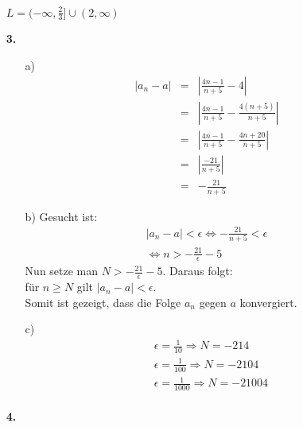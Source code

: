 \documentclass [a4paper,11pt]{article}
\begin{document}
\begin{enumerate}
            $L = (- \infty, \frac{2}{3}] \cup (2, \infty)$
        \item[\textbf{3.}]
            \begin{enumerate}
                \item[a)]
                    \begin{align}
                        |a_n - a| &=& |\frac{4n-1}{n+5} - 4| \\
                        &=& |\frac{4n-1}{n+5} - \frac{4(n+5)}{n+5}| \\
                        &=& |\frac{4n-1}{n+5} - \frac{4n+20}{n+5}| \\
                        &=& |\frac{-21}{n+5}| \\
                        &=& - \frac{21}{n+5}
                    \end{align}
                \item[b)]
                    Gesucht ist:
                    \begin{align}
                        |a_n - a| < \epsilon \Leftrightarrow - \frac{21}{n+5} < \epsilon \\
                        \Leftrightarrow n > - \frac{21}{\epsilon} -5
                    \end{align}
                    Nun setze man $N > - \frac{21}{\epsilon} -5$. Daraus folgt: \\
                    für $n \geq N$ gilt $|a_n - a| < \epsilon$. \\
                    Somit ist gezeigt, dass die Folge $a_n$ gegen $a$ konvergiert.
                \item[c)]
                    \begin{align}
                        & \epsilon = \frac{1}{10} \Rightarrow N = -214 \\
                        & \epsilon = \frac{1}{100} \Rightarrow N = -2104 \\
                        & \epsilon = \frac{1}{1000} \Rightarrow N = -21004 \\
                    \end{align}
            \end{enumerate}
        \item[\textbf{4.}]

            

    \end{enumerate}
\end{document}
